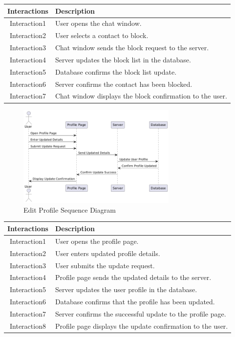 \begin{longtable}{|c|p{10cm}|}
    \hline
    \textbf{Interactions} & \textbf{Description} \\
    \hline
    Interaction1 & User opens the chat window. \\
    \hline
    Interaction2 & User selects a contact to block. \\
    \hline
    Interaction3 & Chat window sends the block request to the server. \\
    \hline
    Interaction4 & Server updates the block list in the database. \\
    \hline
    Interaction5 & Database confirms the block list update. \\
    \hline
    Interaction6 & Server confirms the contact has been blocked. \\
    \hline
    Interaction7 & Chat window displays the block confirmation to the user. \\
    \hline
\end{longtable}
\newpage

\begin{figure}[h]
    \centering
    \includegraphics[width=0.7\textwidth]{images/edit_profile.png} %
    \caption{Edit Profile Sequence Diagram}
    \label{fig:example}
\end{figure}


\begin{longtable}{|c|p{10cm}|}
    \hline
    \textbf{Interactions} & \textbf{Description} \\
    \hline
    Interaction1 & User opens the profile page. \\
    \hline
    Interaction2 & User enters updated profile details. \\
    \hline
    Interaction3 & User submits the update request. \\
    \hline
    Interaction4 & Profile page sends the updated details to the server. \\
    \hline
    Interaction5 & Server updates the user profile in the database. \\
    \hline
    Interaction6 & Database confirms that the profile has been updated. \\
    \hline
    Interaction7 & Server confirms the successful update to the profile page. \\
    \hline
    Interaction8 & Profile page displays the update confirmation to the user. \\
    \hline
\end{longtable}

